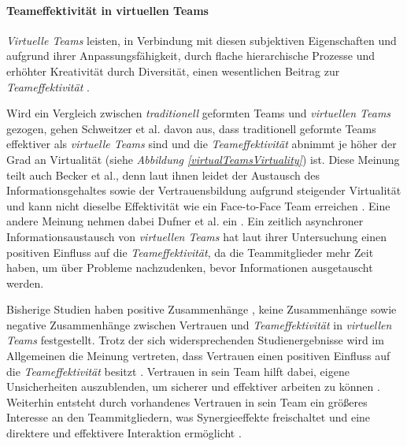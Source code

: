 \documentclass[a4paper,11pt]{article}%
\renewcommand{\\}{\vspace*{0.5\baselineskip} \newline}
\begin{document}
{\paragraph{Teameffektivität in virtuellen Teams}
\label{TEinVT}
\textit{Virtuelle Teams} leisten, in Verbindung mit diesen subjektiven Eigenschaften und aufgrund ihrer Anpassungsfähigkeit, durch flache hierarchische Prozesse und erhöhter Kreativität durch Diversität, einen wesentlichen Beitrag zur \textit{Teameffektivität} \citep{handke2019alles} \citep{becker2002fuhrung}.

Wird ein Vergleich zwischen \textit{traditionell} geformten Teams und \textit{virtuellen Teams} gezogen, gehen Schweitzer et al. \citep{schweitzer2010conceptualizing} davon aus, dass traditionell geformte Teams effektiver als \textit{virtuelle Teams} sind und die \textit{Teameffektivität} abnimmt je höher der Grad an Virtualität (siehe \textit{Abbildung \ref{virtualTeamsVirtuality}}) ist.
Diese Meinung teilt auch Becker et al., denn laut ihnen leidet der Austausch des Informationsgehaltes sowie der Vertrauensbildung aufgrund steigender Virtualität und kann nicht dieselbe Effektivität wie ein Face-to-Face Team erreichen \citep{becker2002fuhrung}.
Eine andere Meinung nehmen dabei Dufner et al. ein \citep{dufner2002asynchronous}. Ein zeitlich asynchroner Informationsaustausch von \textit{virtuellen Teams} hat laut ihrer Untersuchung einen positiven Einfluss auf die \textit{Teameffektivität}, da die Teammitglieder mehr Zeit haben, um über Probleme nachzudenken, bevor Informationen ausgetauscht werden.

Bisherige Studien haben positive Zusammenhänge \citep{davis2000trusted}, keine Zusammenhänge \citep{hertel2004managing} sowie negative Zusammenhänge \citep{dirks1999effects} zwischen Vertrauen und \textit{Teameffektivität} in \textit{virtuellen Teams} festgestellt.
Trotz der sich widersprechenden Studienergebnisse wird im Allgemeinen die Meinung vertreten, dass Vertrauen einen positiven Einfluss auf die \textit{Teameffektivität} besitzt \citep{de2016trust}. 
Vertrauen in sein Team hilft dabei, eigene Unsicherheiten auszublenden, um sicherer und effektiver arbeiten zu können \citep{de2010does}. Weiterhin entsteht durch vorhandenes Vertrauen in sein Team ein größeres Interesse an den Teammitgliedern, was Synergieeffekte freischaltet und eine direktere und effektivere Interaktion ermöglicht \citep{dirks1999effects}. 
	
}
\end{document}
